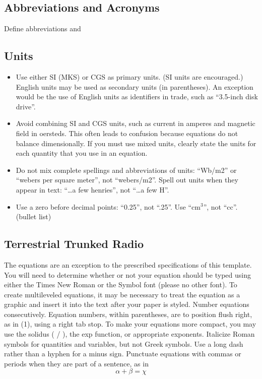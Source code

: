 \documentclass[letterpaper, 10 pt, conference]{ieeeconf}  %
\begin{document}
\subsection{Abbreviations and Acronyms} Define abbreviations and 

\subsection{Units}

\begin{itemize}

\item Use either SI (MKS) or CGS as primary units. (SI units are encouraged.) English units may be used as secondary units (in parentheses). An exception would be the use of English units as identifiers in trade, such as ``3.5-inch disk drive''.
\item Avoid combining SI and CGS units, such as current in amperes and magnetic field in oersteds. This often leads to confusion because equations do not balance dimensionally. If you must use mixed units, clearly state the units for each quantity that you use in an equation.
\item Do not mix complete spellings and abbreviations of units: ``Wb/m2'' or ``webers per square meter'', not ``webers/m2''.  Spell out units when they appear in text: ``\ldots a few henries'', not ``\ldots a few H''.
\item Use a zero before decimal points: ``0.25'', not ``.25''. Use ``cm$^3$'', not ``cc''. (bullet list)

\end{itemize}


\subsection{Terrestrial Trunked Radio}

The equations are an exception to the prescribed specifications of this template. You will need to determine whether or not your equation should be typed using either the Times New Roman or the Symbol font (please no other font). To create multileveled equations, it may be necessary to treat the equation as a graphic and insert it into the text after your paper is styled. Number equations consecutively. Equation numbers, within parentheses, are to position flush right, as in (1), using a right tab stop. To make your equations more compact, you may use the solidus ( / ), the exp function, or appropriate exponents. Italicize Roman symbols for quantities and variables, but not Greek symbols. Use a long dash rather than a hyphen for a minus sign. Punctuate equations with commas or periods when they are part of a sentence, as in
\begin{equation}
\alpha + \beta = \chi
\end{equation}
\end{document}

